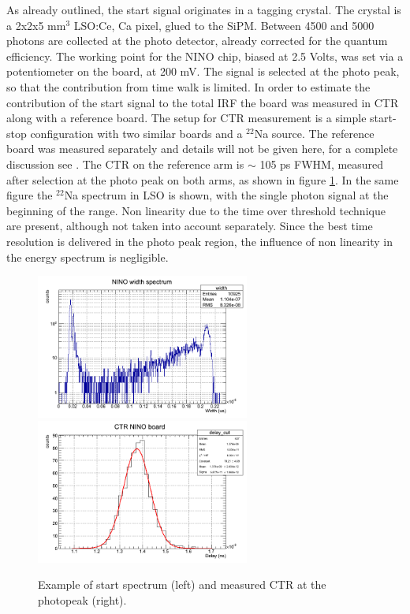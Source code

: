 As already outlined, the start signal originates in a tagging crystal.
The crystal is a 2x2x5 mm$^{3}$ LSO:Ce, Ca pixel, glued to the SiPM. Between 4500 and 5000 photons are collected at the photo detector, already corrected for the quantum efficiency. 
The working point for the NINO chip, biased at 2.5 Volts, was set via a potentiometer on the board, at 200 mV.
The signal is selected at the photo peak, so that the contribution from time walk is limited.
In order to estimate the contribution of the start signal to the total IRF the board was measured in CTR along with a reference board.
The setup for CTR measurement is a simple start-stop configuration with two similar boards and a $^{22}$Na source.
The reference board was measured separately and details will not be given here, for a complete discussion see \cite{Gundacker2014}. The CTR on the reference arm is $\sim$ 105 ps FWHM, measured after selection at the photo peak on both arms, as shown in figure \ref{fig:start}.
In the same figure the $^{22}$Na spectrum in LSO is shown, with the single photon signal at the beginning of the range. Non linearity due to the time over threshold technique are present, although not taken into account separately. Since the best time resolution is delivered in the photo peak region, the influence of non linearity in the energy spectrum is negligible. 
\begin{figure}[htbp]
\begin{center}
\includegraphics[width=7cm]{../Pictures/Chapter_8/spectrum_NINO.png}
\includegraphics[width=7cm]{../Pictures/Chapter_8/CTR.png}
\end{center}
\caption[Start characteristics]{Example of start spectrum (left) and measured CTR at the photopeak (right).}
\label{fig:start}
\end{figure}

